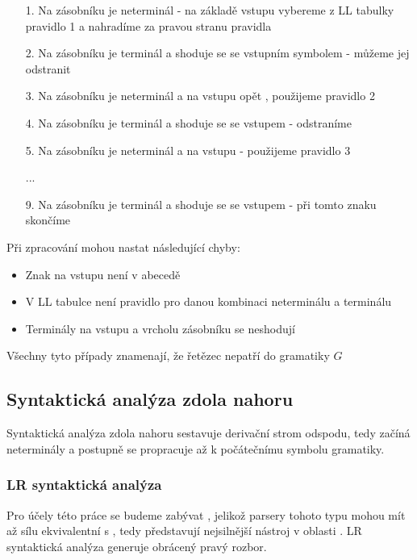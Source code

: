 \begin{exmp}
\begin{itemize}
  \item[1.] Na zásobníku je neterminál  - na základě vstupu \symb{(} vybereme
  z LL tabulky pravidlo 1 a nahradíme  za pravou stranu pravidla
  \item[2.] Na zásobníku je terminál \symb{(} a shoduje se se vstupním symbolem - můžeme jej odstranit
  \item[3.] Na zásobníku je neterminál  a na vstupu opět \symb{(}, použijeme pravidlo 2
  \item[4.] Na zásobníku je terminál \symb{(} a shoduje se se vstupem - odstraníme
  \item[5.] Na zásobníku je neterminál  a na vstupu \symb{)} - použijeme pravidlo 3
  \item[] ...
  \item[9.] Na zásobníku je terminál \symb{\$} a shoduje se se vstupem - při tomto znaku skončíme
\end{itemize}
\end{exmp}

\noindent
Při zpracování mohou nastat následující chyby:

\begin{itemize}
  \item Znak na vstupu není v abecedě
  \item V LL tabulce není pravidlo pro danou kombinaci neterminálu a terminálu
  \item Terminály na vstupu a vrcholu zásobníku se neshodují
\end{itemize}

\noindent
Všechny tyto případy znamenají, že řetězec nepatří do gramatiky $G$

\subsection{Syntaktická analýza zdola nahoru}

Syntaktická analýza zdola nahoru sestavuje derivační strom odspodu,
tedy začíná neterminály a postupně se propracuje až k počátečnímu symbolu
gramatiky.


\subsubsection*{LR syntaktická analýza}
Pro účely této práce se budeme zabývat , jelikož
parsery tohoto typu mohou mít až sílu ekvivalentní s \cite[str. 155]{MedunaIFJ}, tedy představují nejsilnější nástroj
v oblasti .
LR syntaktická analýza generuje obrácený pravý rozbor.\\

